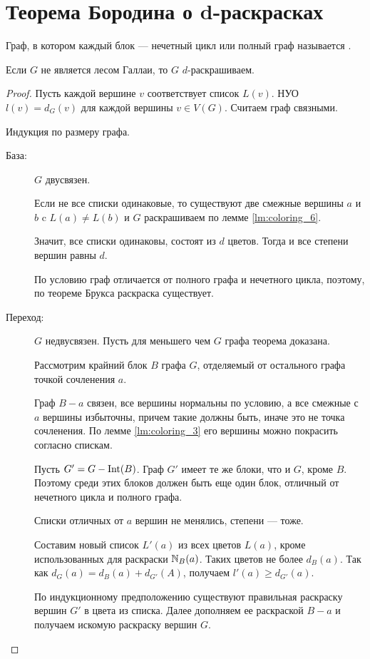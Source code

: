 \section{Теорема Бородина о d-раскрасках}
\begin{definition}
    Граф, в котором каждый блок --- нечетный цикл или полный граф называется .
\end{definition}

\begin{theorem}[Бородин, 1977]
    Если $G$ не является лесом Галлаи, то $G$ $d$-раскрашиваем.
\end{theorem}
\begin{proof}
	Пусть каждой вершине $v$ соответствует список $L(v)$. НУО $l(v) = d_G(v)$ для каждой вершины $v \in V(G)$.  Считаем граф связными. 

	Индукция по размеру графа.
	\begin{description}
		\item[База:] $G$ двусвязен. 

			Если не все списки одинаковые, то существуют две смежные вершины $a$ и $b$ c $L(a) \neq L(b)$ и $G$ раскрашиваем по лемме \ref{lm:coloring_6}.

			Значит, все списки одинаковы, состоят из  $d$ цветов. Тогда и все степени вершин равны $d$.

			По условию граф отличается  от полного графа и нечетного цикла, поэтому, по теореме Брукса раскраска существует.
		\item [Переход:] $G$ недвусвязен.
			Пусть для меньшего чем $G$ графа теорема доказана. 

			Рассмотрим крайний блок $B$ графа $G$, отделяемый от остального графа точкой сочленения $a$. 

			Граф $B-a$ связен, все вершины нормальны по условию, а все смежные с $ a$ вершины избыточны, причем такие должны быть, иначе это не точка сочленения.
			По лемме \ref{lm:coloring_3} его вершины можно покрасить согласно спискам.

			Пусть $G' = G - \operatorname{Int}(B)$. Граф $G'$ имеет те же блоки, что и $G$, кроме $B$. Поэтому среди этих блоков должен быть еще один блок, отличный от нечетного цикла и полного графа.

			Списки отличных от $a$ вершин не менялись, степени --- тоже.

			Составим новый список $L'(a)$ из всех цветов $L(a)$,  кроме использованных для раскраски $\mathbb{N}_B(a)$. Таких цветов не более $d_B(a)$. Так как $d_G(a) = d_B(a) + d_{G'}(A)$, получаем $l'(a) \ge d_{G'}(a)$.

			По индукционному предположению существуют правильная раскраску вершин $G'$ в цвета из списка. Далее дополняем ее раскраской $B-a$ и получаем искомую раскраску вершин $G$.
	\end{description}
\end{proof}
